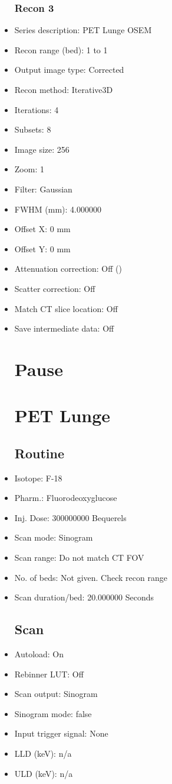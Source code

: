 \documentclass[12pt]{article}
\begin{document}
\begin{itemize}[noitemsep]
\subsubsection{Recon 3}
\item Series description: PET Lunge OSEM
\item Recon range (bed): 1 to 1
\item Output image type: Corrected
\item Recon method: Iterative3D
\item Iterations: 4
\item Subsets: 8
\item Image size: 256
\item Zoom: 1
\item Filter: Gaussian
\item FWHM (mm): 4.000000
\item Offset X: 0 mm
\item Offset Y: 0 mm
\item Attenuation correction: Off ()
\item Scatter correction: Off
\item Match CT slice location: Off
\item Save intermediate data: Off
\section{Pause}
\section{PET Lunge }\subsection{Routine}
\item Isotope: F-18
\item Pharm.: Fluorodeoxyglucose
\item Inj. Dose: 300000000 Bequerels
\item Scan mode: Sinogram
\item Scan range: Do not match CT FOV
\item No. of beds: Not given. Check recon range
\item Scan duration/bed: 20.000000 Seconds
\subsection{Scan}
\item Autoload: On
\item Rebinner LUT: Off
\item Scan output: Sinogram
\item Sinogram mode: false
\item Input trigger signal: None
\item LLD (keV): n/a
\item ULD (keV): n/a

\end{itemize}
\end{document}
